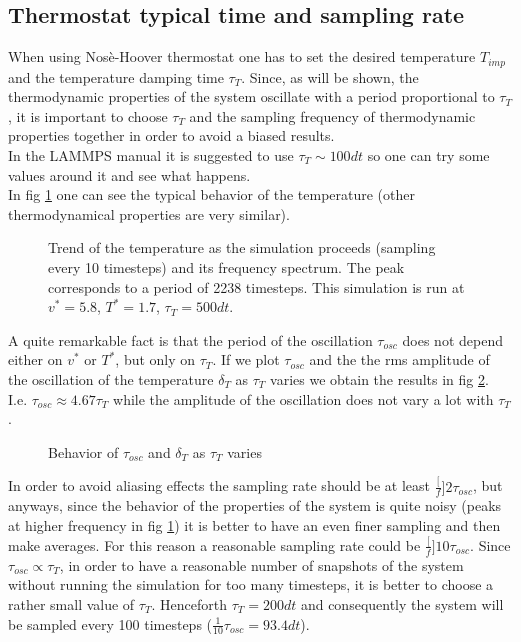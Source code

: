 \documentclass[a4paper, 11pt]{article}
\begin{document}
  \subsection{Thermostat typical time and sampling rate}
    When using Nosè-Hoover thermostat one has to set the desired temperature $T_{imp}$ and the temperature damping time $\tau_T$. Since, as will be shown, the thermodynamic properties of the system oscillate with a period proportional to $\tau_T$, it is important to choose $\tau_T$ and the sampling frequency of thermodynamic properties together in order to avoid a biased results. \\
    In the LAMMPS manual it is suggested to use $\tau_T \sim 100 dt$ \cite{rif:lammps} so one can try some values around it and see what happens. \\
    In fig \ref{fig:T_behavior} one can see the typical behavior of the temperature (other thermodynamical properties are very similar).

    \begin{figure}[H]
      \centering
       \hspace{-0.5cm}
      \caption{Trend of the temperature as the simulation proceeds (sampling every 10 timesteps) and its frequency spectrum. The peak corresponds to a period of 2238 timesteps. This simulation is run at $v^* = 5.8$, $T^{*} = 1.7$, $\tau_T = 500dt$.}
      \label{fig:T_behavior}
    \end{figure}

    A quite remarkable fact is that the period of the oscillation $\tau_{osc}$ does not depend either on $v^{*}$ or $T^{*}$, but only on $\tau_T$. If we plot $\tau_{osc}$ and the the rms amplitude of the oscillation of the temperature $\delta_T$ as $\tau_T$ varies we obtain the results in fig \ref{fig:tau_T}. I.e. $\tau_{osc} \approx 4.67 \tau_T$ while the amplitude of the oscillation does not vary a lot with $\tau_T$.

    \begin{figure}[H]
      \centering
      \caption{Behavior of $\tau_{osc}$ and $\delta_T$ as $\tau_T$ varies}
      \label{fig:tau_T}
    \end{figure}

    In order to avoid aliasing effects the sampling rate should be at least $\frac[f]{2}{\tau_{osc}}$, but anyways, since the behavior of the properties of the system is quite noisy (peaks at higher frequency in fig \ref{fig:T_behavior}) it is better to have an even finer sampling and then make averages.
    For this reason a reasonable sampling rate could be $\frac[f]{10}{\tau_{osc}}$.
    Since $\tau_{osc} \propto \tau_T$, in order to have a reasonable number of snapshots of the system without running the simulation for too many timesteps, it is better to choose a rather small value of $\tau_T$. Henceforth  $\tau_T = 200 dt$ and consequently the system will be sampled every 100 timesteps ($\frac{1}{10}\tau_{osc} = 93.4 dt$).
\end{document}
